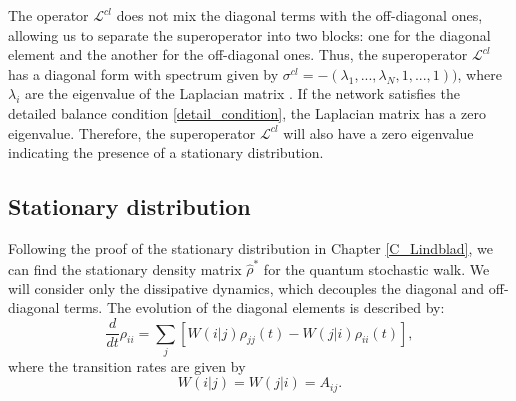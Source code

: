 The operator $\mathcal{L}^{cl}$ does not mix the diagonal terms with the off-diagonal ones, allowing us to separate the superoperator into two blocks: one for the diagonal element and the another for the off-diagonal ones.
Thus, the superoperator $\mathcal{L}^{cl}$ has a diagonal form with spectrum given by $\sigma^{cl} = -(\lambda_1,...,\lambda_N,1,...,1))$, where $\lambda_i$ are the eigenvalue of the Laplacian matrix \cite{Bruderer_Plenio}.
If the network satisfies the detailed balance condition \eqref{detail_condition}, the Laplacian matrix has a zero eigenvalue. Therefore, the superoperator $\mathcal{L}^{cl}$ will also have a zero eigenvalue indicating the presence of a stationary distribution.

\begin{comment}
    \begin{equation}
    \begin{split}
    \mathcal{L}^{qm}\ket{k}\bra{l} =& -i\hat L\ket{k}\bra{l} + i \ket{k}\bra{l}\hat L\\
    &=\frac{i}{2}\sum_{ij} - L_{ij}\ket{i}\braket{j}{k}\bra{l} + \ket{k}\braket{l}{i}\bra{j}\\
    &=\frac{1}{2}\sum_i -L_{ik} \ket{i}\bra{l} + \sum_i L_{li}\ket{k}\bra{i}\\
\end{split}
\end{equation}

Instead the diagonal terms
\begin{equation}
\begin{split}
\mathcal{L}^{qm}\ket{l}\bra{l} =& -i\hat L\ket{l}\bra{l} + i \ket{l}\bra{l}\hat L\\
&=\frac{i}{2}\sum_{ij} - L_{ij}\ket{i}\braket{j}{l}\bra{l} + \ket{l}\braket{l}{i}\bra{j}\\
&=\frac{1}{2}\sum_i -L_{il} \ket{i}\bra{l} + \sum_i L_{li}\ket{l}\bra{i} = 0\\
\end{split}
\end{equation}
\end{comment}

\subsection{Stationary distribution}

Following the proof of the stationary distribution in Chapter \ref{C_Lindblad}, we can find the stationary density matrix $\hat\rho^*$ for the quantum stochastic walk.
We will consider only the dissipative dynamics, which decouples the diagonal and off-diagonal terms. The evolution of the diagonal elements is described by:
\begin{equation}
    \frac{d}{dt}\rho_{ii} = \sum_j\left[W(i|j)\rho_{jj}(t) - W(j|i)\rho_{ii}(t)\right],
\end{equation}
where the transition rates are given by
\begin{equation}
    W(i|j) = W(j|i) = A_{ij}.
\end{equation}

